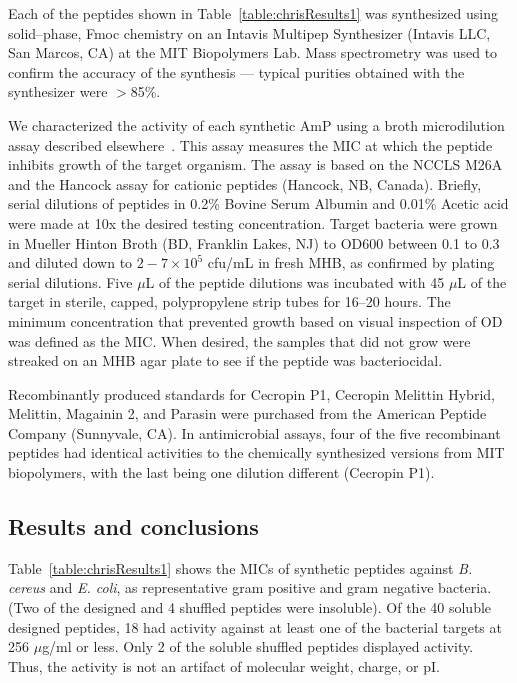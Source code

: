 Each of the peptides shown in Table~\vref{table:chrisResults1} was
synthesized using solid--phase, Fmoc chemistry on an Intavis
Multipep Synthesizer (Intavis LLC, San Marcos, CA) at the MIT
Biopolymers Lab. Mass spectrometry was used to confirm the accuracy
of the synthesis --- typical purities obtained with the synthesizer
were $>$85\%.

    We characterized the activity of each synthetic
    AmP using a broth microdilution assay described
    elsewhere~\cite{wu1999interaction}.  This assay measures the
    MIC at which the
    peptide inhibits growth of the target organism.
The assay is based on the NCCLS M26A and the Hancock assay for
cationic peptides (Hancock, NB, Canada). Briefly, serial dilutions
of peptides in 0.2\% Bovine Serum Albumin and 0.01\% Acetic acid
were made at 10x the desired testing concentration.  Target bacteria
were grown in Mueller Hinton Broth (BD, Franklin Lakes, NJ) to OD600
between 0.1 to 0.3 and diluted down to $2-7\times10^5$ cfu/mL in
fresh MHB, as confirmed by plating serial dilutions.  Five $\mu$L of
the peptide dilutions was incubated with 45 $\mu$L of the target in
sterile, capped, polypropylene strip tubes for 16--20 hours.  The
minimum concentration that prevented growth based on visual
inspection of OD was defined as the MIC.  When desired, the samples
that did not grow were streaked on an MHB agar plate to see if the
peptide was bacteriocidal.

Recombinantly produced standards for Cecropin P1, Cecropin Melittin
Hybrid, Melittin, Magainin 2, and Parasin were purchased from the
American Peptide Company (Sunnyvale, CA).   In antimicrobial assays,
four of the five recombinant peptides had identical activities to
the chemically synthesized versions from MIT biopolymers, with the
last being one dilution different (Cecropin P1).

\subsection{Results and conclusions}
    Table~\vref{table:chrisResults1} shows the MICs of synthetic peptides
    against \emph{B. cereus} and \emph{E. coli},
    as representative gram positive and gram negative
    bacteria.  (Two of the designed and 4 shuffled
    peptides were insoluble).  Of the 40 soluble
    designed peptides, 18 had activity against at least
    one of the bacterial targets at 256 $\mu$g/ml or less.
    Only 2 of the soluble shuffled peptides displayed
    activity.  Thus, the activity is not an artifact
    of molecular weight, charge, or pI.

